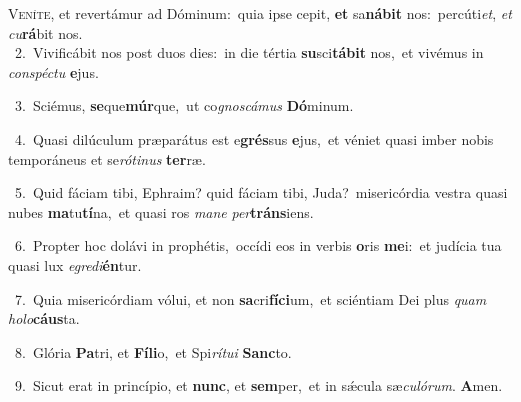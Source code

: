 \lettrine{\initial\textcolor{\initialcolor}{V}}{eníte,} et revertámur ad Dóminum:~\dagger quia ipse cepit, \textbf{et} sa\-\textbf{ná}\-\textbf{bit} nos:~\star percúti\-\textit{et}\-, \textit{et} \textit{cu}\-\textbf{rá}bit nos.\\
{\numbfont\textcolor{\numbcolor}{~2.}}~Vivificábit nos post duos dies:~\dagger in die tértia \textbf{su}\-sci\-\textbf{tá}\-\textbf{bit} nos,~\star et vivémus in \textit{con}\-\textit{spéc}\textit{tu} \textbf{e}\-jus.\par
{\numbfont\textcolor{\numbcolor}{~3.}}~Sciémus, \textbf{se}\-que\-\textbf{múr}\-que,~\star ut co\-\textit{gnos}\-\textit{cá}\textit{mus} \textbf{Dó}\-minum.\par
{\numbfont\textcolor{\numbcolor}{~4.}}~Quasi dilúculum præparátus est e\-\textbf{grés}\-sus \textbf{e}\-jus,~\star et véniet quasi imber nobis temporáneus et se\-\textit{ró}\-\textit{ti}\textit{nus} \textbf{ter}\-ræ.\par
{\numbfont\textcolor{\numbcolor}{~5.}}~Quid fáciam tibi, Ephraim? quid fáciam tibi, Juda?~\dagger misericórdia vestra quasi nubes \textbf{ma}\-tu\-\textbf{tí}\-na,~\star et quasi ros \textit{ma}\-\textit{ne} \textit{per}\-\textbf{tráns}iens.\par
{\numbfont\textcolor{\numbcolor}{~6.}}~Propter hoc dolávi in prophétis,~\dagger occídi eos in verbis \textbf{o}\-ris \textbf{me}\-i:~\star et judícia tua quasi lux \textit{e}\-\textit{gre}\textit{di}\textbf{én}tur.\par
{\numbfont\textcolor{\numbcolor}{~7.}}~Quia misericórdiam vólui, et non \textbf{sa}\-cri\-\textbf{fí}\-\textbf{ci}um,~\star et sciéntiam Dei plus \textit{quam} \textit{ho}\-\textit{lo}\textbf{cáus}ta.\par
{\numbfont\textcolor{\numbcolor}{~8.}}~Glória \textbf{Pa}\-tri, et \textbf{Fí}\-\textbf{li}o,~\star et Spi\-\textit{rí}\-\textit{tu}\textit{i} \textbf{Sanc}\-to.\par
{\numbfont\textcolor{\numbcolor}{~9.}}~Sicut erat in princípio, et \textbf{nunc}\-, et \textbf{sem}\-per,~\star et in sǽcula sæ\-\textit{cu}\-\textit{ló}\textit{rum}. \textbf{A}\-men.\par
